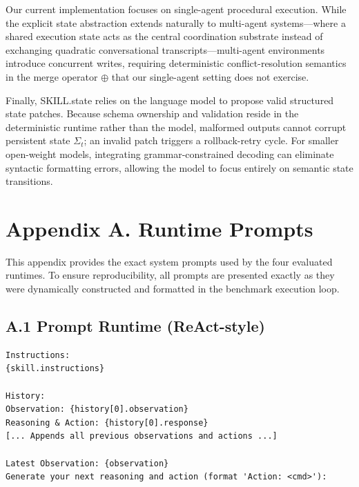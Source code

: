 \documentclass[11pt]{article}
\begin{document}
Our current implementation focuses on single-agent procedural execution. While the explicit state abstraction extends naturally to multi-agent systems—where a shared execution state acts as the central coordination substrate instead of exchanging quadratic conversational transcripts—multi-agent environments introduce concurrent writes, requiring deterministic conflict-resolution semantics in the merge operator $\oplus$ that our single-agent setting does not exercise.

Finally, SKILL.state relies on the language model to propose valid structured state patches. Because schema ownership and validation reside in the deterministic runtime rather than the model, malformed outputs cannot corrupt persistent state $\Sigma_t$; an invalid patch triggers a rollback-retry cycle. For smaller open-weight models, integrating grammar-constrained decoding can eliminate syntactic formatting errors, allowing the model to focus entirely on semantic state transitions.




%


\appendix



\onecolumn

\section*{Appendix A. Runtime Prompts}
\label{appendix:runtime_prompts}

This appendix provides the exact system prompts used by the four evaluated runtimes. To ensure reproducibility, all prompts are presented exactly as they were dynamically constructed and formatted in the benchmark execution loop.

\subsection*{A.1 Prompt Runtime (ReAct-style)}
\begin{lstlisting}
Instructions:
{skill.instructions}

History:
Observation: {history[0].observation}
Reasoning & Action: {history[0].response}
[... Appends all previous observations and actions ...]

Latest Observation: {observation}
Generate your next reasoning and action (format 'Action: <cmd>'):
\end{lstlisting}
\end{document}

